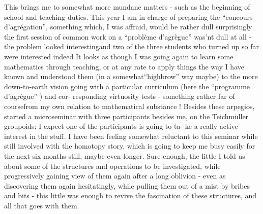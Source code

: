 
This brings me to somewhat more mundane matters - such as the
beginning of school and teaching duties. This year I am  in
charge of preparing the ``concours d'agrégation'', something which, I
was affraid, would be rather dull   surprisingly the first
session of common work on a ``problème d'agrègue'' was'nt dull at all -
the problem looked interesting\hand{,}and  two of the three students who
turned up so far were interested indeed\hand{,}  It looks as though I was going
again to learn some mathematics through teaching, or at any rate 
 to apply things the way I have known and understood them (in a
somewhat``highbrow'' way maybe) to the more down-to-earth vision going
with a particular curriculum (here the ``programme d'agrègue'' ) and cor-%
responding virtuosity tests - something rather far\hand{,} of course\hand{,}from my
own relation to mathematical substance ! Besides these arpegios, 
started a microseminar\hand{,} with three participants besides me, on the
Teichmüller groupoids; I expect one of the participants is going to ta-%
ke a really active interest in the stuff. I have been feeling somewhat
reluctant to  this seminar while still involved with the
homotopy story, which is going to keep me busy easily for the next
six months still, maybe even longer. Sure enough, the little I told
us about some of the structures and operations to be investigated,
while progressively gaining view of them again after a long oblivion
- even as discovering them again hesitatingly, while pulling them out
of a mist by bribes and bits - this little was enough to revive the
 fascination of these structures, and all that goes with them.

